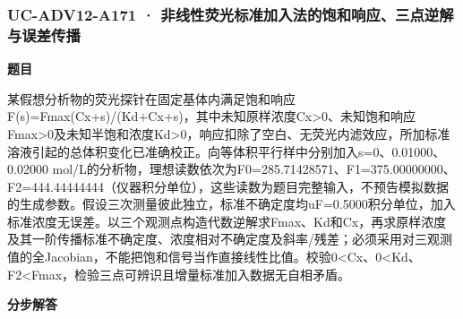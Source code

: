 \documentclass[UTF8,11pt,a4paper]{ctexart}
\begin{document}
\subsubsection*{UC-ADV12-A171 · 非线性荧光标准加入法的饱和响应、三点逆解与误差传播}
\noindent\textbf{题目}\par
某假想分析物的荧光探针在固定基体内满足饱和响应F(s)=Fmax(Cx+s)/(Kd+Cx+s)，其中未知原样浓度Cx>0、未知饱和响应Fmax>0及未知半饱和浓度Kd>0，响应扣除了空白、无荧光内滤效应，所加标准溶液引起的总体积变化已准确校正。向等体积平行样中分别加入s=0、0.01000、0.02000 mol/L的分析物，理想读数依次为F0=285.71428571、F1=375.00000000、F2=444.44444444（仪器积分单位），这些读数为题目完整输入，不预告模拟数据的生成参数。假设三次测量彼此独立，标准不确定度均uF=0.5000积分单位，加入标准浓度无误差。以三个观测点构造代数逆解求Fmax、Kd和Cx，再求原样浓度及其一阶传播标准不确定度、浓度相对不确定度及斜率/残差；必须采用对三观测值的全Jacobian，不能把饱和信号当作直接线性比值。校验0<Cx、0<Kd、F2<Fmax，检验三点可辨识且增量标准加入数据无自相矛盾。\par
\medskip\noindent\textbf{分步解答}
\end{document}
